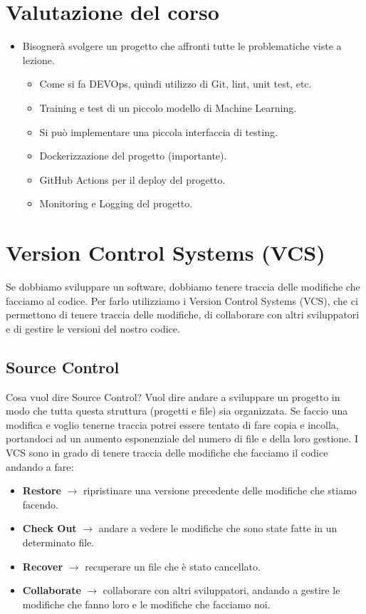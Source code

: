 \documentclass[a4paper,12pt]{article}
\begin{document}
\section{Valutazione del corso}
\begin{itemize}
    \item Bisognerà svolgere un progetto che affronti tutte le problematiche viste a lezione.
    \begin{itemize}
        \item Come si fa DEVOps, quindi utilizzo di Git, lint, unit test, etc.
        \item Training e test di un piccolo modello di Machine Learning.
        \item Si può implementare una piccola interfaccia di testing.
        \item Dockerizzazione del progetto (importante).
        \item GitHub Actions per il deploy del progetto.
        \item Monitoring e Logging del progetto.
    \end{itemize}
\end{itemize}

\section{Version Control Systems (VCS)}
Se dobbiamo sviluppare un software, dobbiamo tenere traccia delle modifiche che facciamo al codice. Per farlo utilizziamo i Version Control Systems (VCS), che ci permettono di tenere traccia delle modifiche, di collaborare con altri sviluppatori e di gestire le versioni del nostro codice.

\subsection{Source Control}
Cosa vuol dire Source Control? Vuol dire andare a sviluppare un progetto in modo che tutta questa struttura (progetti e file) sia organizzata. Se faccio una modifica e voglio tenerne traccia potrei essere tentato di fare copia e incolla, portandoci
ad un aumento esponenziale del numero di file e della loro gestione. I VCS
sono in grado di tenere traccia delle modifiche che facciamo il codice andando a fare:
\begin{itemize}
    \item \textbf{Restore} $\rightarrow$ ripristinare una versione precedente delle modifiche che stiamo facendo.
    \item \textbf{Check Out} $\rightarrow$ andare a vedere le modifiche che sono state fatte in un determinato file.
    \item \textbf{Recover} $\rightarrow$ recuperare un file che è stato cancellato.
    \item \textbf{Collaborate} $\rightarrow$ collaborare con altri sviluppatori, andando a gestire le modifiche che fanno loro e le modifiche che facciamo noi.
\end{itemize}
\end{document}
